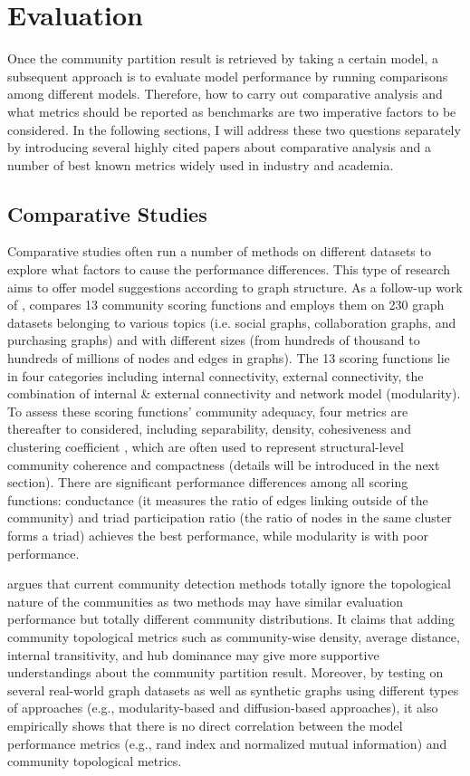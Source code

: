 
\section{Evaluation}
Once the community partition result is retrieved by taking a certain model, a subsequent approach is to evaluate model performance by running comparisons among different models. Therefore, how to carry out comparative analysis and what metrics should be reported as benchmarks are two imperative factors to be considered. In the following sections, I will address these two questions separately by introducing several highly cited papers about comparative analysis and a number of best known metrics widely used in industry and academia.    

\subsection{Comparative Studies}
Comparative studies often run a number of methods on different datasets to explore what factors to cause the performance differences. This type of research aims to  offer model suggestions according to graph structure. As a follow-up work of \cite{leskovec2010empirical}, \cite{yang2015defining} compares 13 community scoring functions and employs them on 230 graph datasets belonging to various topics (i.e. social graphs, collaboration graphs, and purchasing graphs) and with different sizes (from hundreds of thousand to hundreds of millions of nodes and edges in graphs). The 13 scoring functions lie in four categories including internal connectivity, external connectivity, the combination of internal \& external connectivity and network model (modularity). To assess these scoring functions' community adequacy, four metrics are thereafter to considered, including separability, density, cohesiveness and clustering coefficient , which are often used to represent structural-level community coherence and compactness (details will be introduced in the next section). There are significant performance differences among all scoring functions: conductance (it measures the ratio of edges linking outside of the community) and triad participation ratio (the ratio of nodes in the same cluster forms a triad) achieves the best performance, while modularity is with poor performance.

\cite{orman2012comparative} argues that current community detection methods totally ignore the topological nature
of the communities as two methods may have similar evaluation performance but totally different community distributions. It claims that adding community topological metrics such as community-wise density, average distance, internal transitivity, and hub dominance may give more supportive understandings about the community partition result. Moreover, by testing on several real-world graph datasets as well as synthetic graphs using different types of approaches (e.g., modularity-based and diffusion-based approaches), it also empirically shows that there is no direct correlation between the model performance metrics (e.g., rand index and normalized mutual information) and community topological metrics. 

